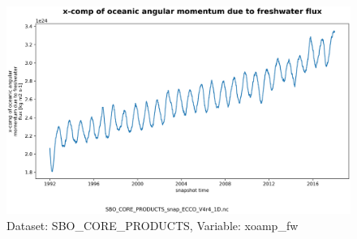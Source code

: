 \begin{figure}[H]
\centering
\includegraphics[scale=0.55]{../images/plots/v4r4/oneD_plots/SBO_Core_Products/xoamp_fw.png}
\caption{Dataset: SBO\_CORE\_PRODUCTS, Variable: xoamp\_fw}
\label{tab:table-SBO_CORE_PRODUCTS_xoamp_fw-Plot}
\end{figure}
\newpage
\pagebreak

